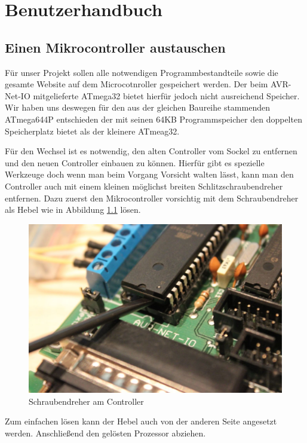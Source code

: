 \chapter{Benutzerhandbuch} 

\section{Einen Mikrocontroller austauschen}
Für unser Projekt sollen alle notwendigen Programmbestandteile sowie die gesamte
Website auf dem Microcotnroller gespeichert werden. Der beim AVR-Net-IO
mitgelieferte ATmega32 bietet hierfür jedoch nicht ausreichend Speicher.
Wir haben uns deswegen für den aus der gleichen Baureihe stammenden ATmega644P
entschieden der mit seinen 64KB Programmspeicher den doppelten Speicherplatz
bietet als der kleinere ATmeag32.

Für den Wechsel ist es notwendig, den alten Controller vom Sockel zu entfernen
und den neuen Controller einbauen zu können. Hierfür gibt es spezielle
Werkzeuge doch wenn man beim Vorgang Vorsicht walten lässt, kann man den
Controller auch mit einem kleinen möglichst breiten Schlitzschraubendreher
entfernen. Dazu zuerst den Mikrocontroller vorsichtig mit dem Schraubendreher
als Hebel wie in Abbildung \ref{ausbau1} lösen.

\begin{figure}[H]
\centering
\includegraphics[width=13cm]{content/pictures/Anleitung/tauscheProzessor/1_Hebel.jpg}
\caption{Schraubendreher am Controller}
\label{ausbau1}
\end{figure}

Zum einfachen lösen kann der Hebel auch von der anderen Seite angesetzt
werden. Anschließend den gelösten Prozessor abziehen.

